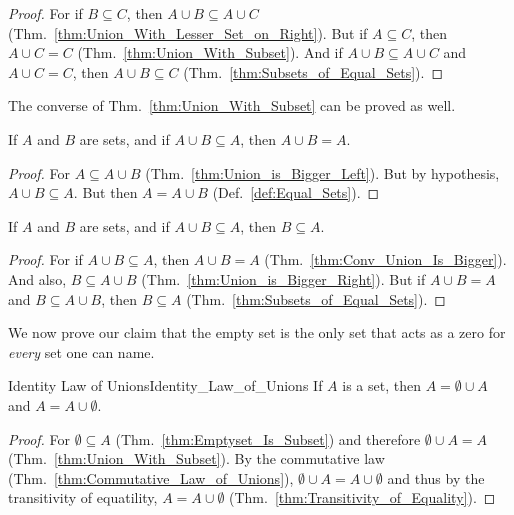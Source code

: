         \begin{proof}
            For if $B\subseteq{C}$, then $A\cup{B}\subseteq{A}\cup{C}$
            (Thm.~\ref{thm:Union_With_Lesser_Set_on_Right}). But if
            $A\subseteq{C}$, then $A\cup{C}={C}$
            (Thm.~\ref{thm:Union_With_Subset}). And if
            $A\cup{B}\subseteq{A}\cup{C}$ and $A\cup{C}=C$, then
            $A\cup{B}\subseteq{C}$ (Thm.~\ref{thm:Subsets_of_Equal_Sets}).
        \end{proof}
        The converse of Thm.~\ref{thm:Union_With_Subset} can be proved as well.
        \begin{theorem}
            \label{thm:Conv_Union_Is_Bigger}%
            If $A$ and $B$ are sets, and if $A\cup{B}\subseteq{A}$, then
            $A\cup{B}=A$.
        \end{theorem}
        \begin{proof}
            For $A\subseteq{A}\cup{B}$ (Thm.~\ref{thm:Union_is_Bigger_Left}).
            But by hypothesis, $A\cup{B}\subseteq{A}$. But then $A=A\cup{B}$
            (Def.~\ref{def:Equal_Sets}).
        \end{proof}
        \begin{theorem}
            \label{thm:Union_is_Equal}%
            If $A$ and $B$ are sets, and if $A\cup{B}\subseteq{A}$, then
            $B\subseteq{A}$.
        \end{theorem}
        \begin{proof}
            For if $A\cup{B}\subseteq{A}$, then $A\cup{B}=A$
            (Thm.~\ref{thm:Conv_Union_Is_Bigger}). And also,
            $B\subseteq{A}\cup{B}$ (Thm.~\ref{thm:Union_is_Bigger_Right}). But
            if $A\cup{B}=A$ and $B\subseteq{A}\cup{B}$, then $B\subseteq{A}$
            (Thm.~\ref{thm:Subsets_of_Equal_Sets}).
        \end{proof}
        We now prove our claim that the empty set is the only set that acts as a
        zero for \textit{every} set one can name.
        \begin{ltheorem}{Identity Law of Unions}{Identity_Law_of_Unions}
            If $A$ is a set, then $A=\emptyset\cup{A}$ and $A=A\cup\emptyset$.
        \end{ltheorem}
        \begin{proof}
            For $\emptyset\subseteq{A}$ (Thm.~\ref{thm:Emptyset_Is_Subset}) and
            therefore $\emptyset\cup{A}=A$ (Thm.~\ref{thm:Union_With_Subset}).
            By the commutative law (Thm.~\ref{thm:Commutative_Law_of_Unions}),
            $\emptyset\cup{A}=A\cup\emptyset$ and thus by the transitivity of
            equatility, $A=A\cup\emptyset$
            (Thm.~\ref{thm:Transitivity_of_Equality}).
        \end{proof}
